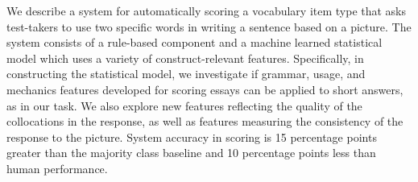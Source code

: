 We describe a system for automatically scoring a vocabulary item type that asks test-takers to use two specific words in writing a sentence based on a picture. The system consists of a rule-based component and a machine learned statistical model which uses a variety of construct-relevant features. Specifically, in constructing the statistical model, we investigate if grammar, usage, and mechanics features developed for scoring essays can be applied to short answers, as in our task.                                We also explore new features reflecting the quality of the collocations  in the response, as well as features measuring the consistency of the response to the picture. System accuracy in scoring is 15 percentage points greater than the majority class baseline and 10 percentage points less than human performance.
